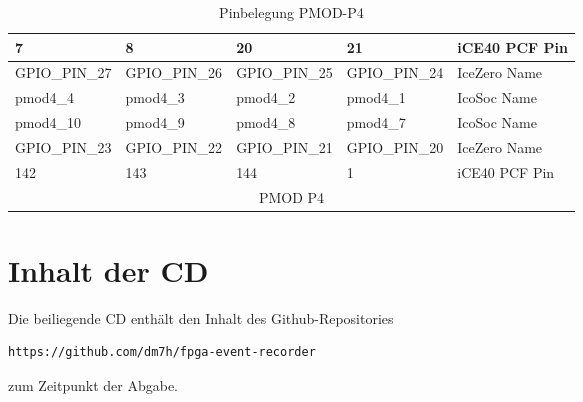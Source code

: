 \begin{table}[H]
\centering
\caption{Pinbelegung PMOD-P4}
\label{tbl:pmod4}
\begin{tabular}{|l|l|l|l|l|}
\hline
\cellcolor[HTML]{EFEFEF}7         & \cellcolor[HTML]{EFEFEF}8        & \cellcolor[HTML]{EFEFEF}20       & \cellcolor[HTML]{EFEFEF}21       & iCE40 PCF Pin      \\ \hline
GPIO\_PIN\_27                     & GPIO\_PIN\_26                    & GPIO\_PIN\_25                    & GPIO\_PIN\_24                    & IceZero Name \\ \hline
\cellcolor[HTML]{C0C0C0}pmod4\_4  & \cellcolor[HTML]{C0C0C0}pmod4\_3 & \cellcolor[HTML]{C0C0C0}pmod4\_2 & \cellcolor[HTML]{C0C0C0}pmod4\_1 & IcoSoc Name  \\ \hline
\cellcolor[HTML]{C0C0C0}pmod4\_10 & \cellcolor[HTML]{C0C0C0}pmod4\_9 & \cellcolor[HTML]{C0C0C0}pmod4\_8 & \cellcolor[HTML]{C0C0C0}pmod4\_7 & IcoSoc Name  \\ \hline
GPIO\_PIN\_23                     & GPIO\_PIN\_22                    & GPIO\_PIN\_21                    & GPIO\_PIN\_20                    & IceZero Name \\ \hline
\cellcolor[HTML]{EFEFEF}142       & \cellcolor[HTML]{EFEFEF}143      & \cellcolor[HTML]{EFEFEF}144      & \cellcolor[HTML]{EFEFEF}1        & iCE40 PCF Pin      \\ \hline
\multicolumn{5}{|c|}{PMOD P4}                                                                                                                             \\ \hline
\end{tabular}
\end{table}

\clearpage

\section{Inhalt der CD}
Die beiliegende CD enthält den Inhalt des Github-Repositories 
\begin{lstlisting}[language=bash]
https://github.com/dm7h/fpga-event-recorder
\end{lstlisting}
zum Zeitpunkt der Abgabe.

